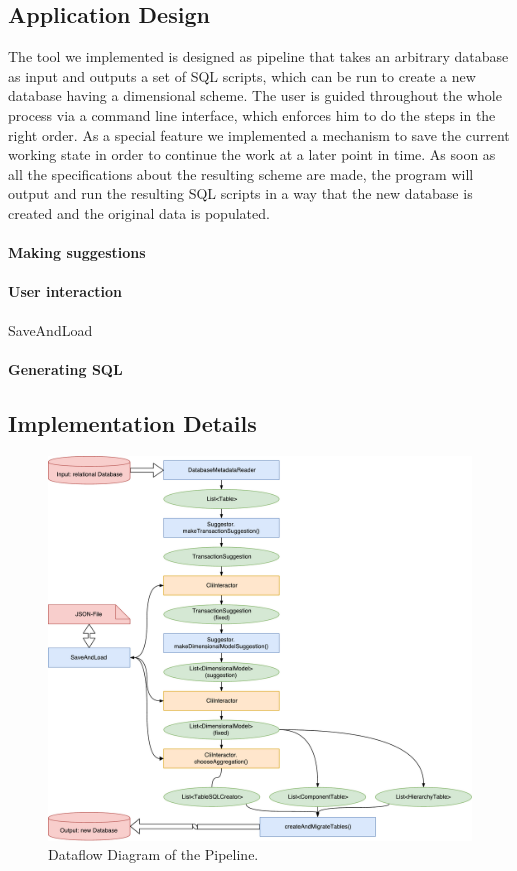 \subsection{Application Design}

The tool we implemented is designed as pipeline that takes an arbitrary database as input and outputs a set of SQL scripts, which can be run to create a new database having a dimensional scheme.
The user is guided throughout the whole process via a command line interface, which enforces him to do the steps in the right order.
As a special feature we implemented a mechanism to save the current working state in order to continue the work at a later point in time.
As soon as all the specifications about the resulting scheme are made, the program will output and run the resulting SQL scripts in a way that the new database is created and the original data is populated.

\paragraph{Making suggestions}

\paragraph{User interaction}

SaveAndLoad

\paragraph{Generating SQL}

\subsection{Implementation Details}

\begin{figure}
  \centering
  \includegraphics[width=\linewidth]{images/dataFlowDiagram}
  \caption{Dataflow Diagram of the Pipeline.}
  \label{fig:dataflowDiagram}
\end{figure}

